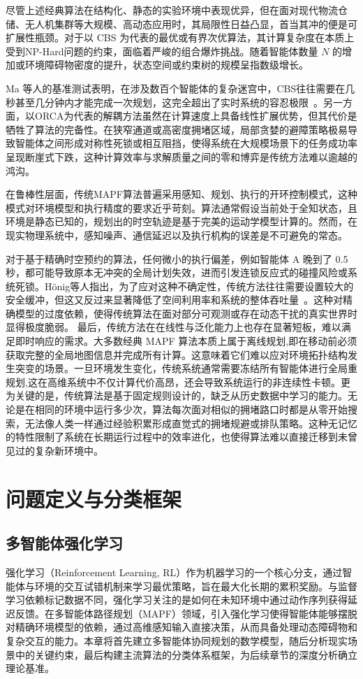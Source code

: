 \documentclass[13.5pt]{extarticle}
\begin{document}
尽管上述经典算法在结构化、静态的实验环境中表现优异，但在面对现代物流仓储、无人机集群等大规模、高动态应用时，其局限性日益凸显，首当其冲的便是可扩展性瓶颈。对于以 CBS 为代表的最优或有界次优算法，其计算复杂度在本质上受到NP-Hard问题的约束，面临着严峻的组合爆炸挑战。随着智能体数量 $N$ 的增加或环境障碍物密度的提升，状态空间或约束树的规模呈指数级增长。

Ma 等人的基准测试表明，在涉及数百个智能体的复杂迷宫中，CBS往往需要在几秒甚至几分钟内才能完成一次规划，这完全超出了实时系统的容忍极限~\cite{skrynnik2024learning, shi2024multi}。另一方面，以ORCA为代表的解耦方法虽然在计算速度上具备线性扩展优势，但其代价是牺牲了算法的完备性。在狭窄通道或高密度拥堵区域，局部贪婪的避障策略极易导致智能体之间形成对称性死锁或相互阻挡，使得系统在大规模场景下的任务成功率呈现断崖式下跌，这种计算效率与求解质量之间的零和博弈是传统方法难以逾越的鸿沟。

在鲁棒性层面，传统MAPF算法普遍采用感知、规划、执行的开环控制模式，这种模式对环境模型和执行精度的要求近乎苛刻。算法通常假设当前处于全知状态，且环境是静态已知的，规划出的时空轨迹是基于完美的运动学模型计算的。然而，在现实物理系统中，感知噪声、通信延迟以及执行机构的误差是不可避免的常态。

对于基于精确时空预约的算法，任何微小的执行偏差，例如智能体 A 晚到了 0.5 秒，都可能导致原本无冲突的全局计划失效，进而引发连锁反应式的碰撞风险或系统死锁。Hönig等人指出，为了应对这种不确定性，传统方法往往需要设置较大的安全缓冲，但这又反过来显著降低了空间利用率和系统的整体吞吐量~\cite{honig2018trajectory}。这种对精确模型的过度依赖，使得传统算法在面对部分可观测或存在动态干扰的真实世界时显得极度脆弱。
最后，传统方法在在线性与泛化能力上也存在显著短板，难以满足即时响应的需求。大多数经典 MAPF 算法本质上属于离线规划,即在移动前必须获取完整的全局地图信息并完成所有计算。这意味着它们难以应对环境拓扑结构发生突变的场景。一旦环境发生变化，传统系统通常需要冻结所有智能体进行全局重规划,这在高维系统中不仅计算代价高昂，还会导致系统运行的非连续性卡顿。更为关键的是，传统算法是基于固定规则设计的，缺乏从历史数据中学习的能力。无论是在相同的环境中运行多少次，算法每次面对相似的拥堵路口时都是从零开始搜索，无法像人类一样通过经验积累形成直觉式的拥堵规避或排队策略。这种无记忆的特性限制了系统在长期运行过程中的效率进化，也使得算法难以直接迁移到未曾见过的复杂新环境中。

\section{问题定义与分类框架}

\subsection{多智能体强化学习}
强化学习（Reinforcement Learning, RL）作为机器学习的一个核心分支，通过智能体与环境的交互试错机制来学习最优策略，旨在最大化长期的累积奖励。与监督学习依赖标记数据不同，强化学习关注的是如何在未知环境中通过动作序列获得延迟反馈。在多智能体路径规划（MAPF）领域，引入强化学习使得智能体能够摆脱对精确环境模型的依赖，通过高维感知输入直接决策，从而具备处理动态障碍物和复杂交互的能力。本章将首先建立多智能体协同规划的数学模型，随后分析现实场景中的关键约束，最后构建主流算法的分类体系框架，为后续章节的深度分析确立理论基准。
\end{document}

